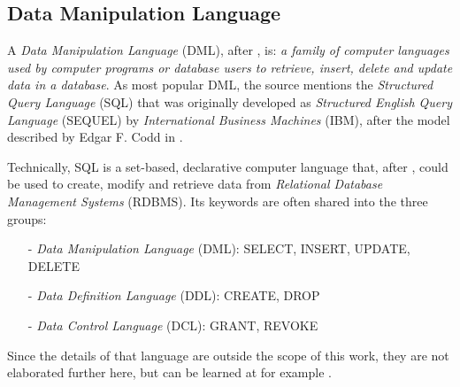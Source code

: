%
%
%
%
%
%
%

\subsection{Data Manipulation Language}
\label{data_manipulation_language_heading}

A \emph{Data Manipulation Language} (DML), after \cite{wikipedia}, is:
\textit{a family of computer languages used by computer programs or database
users to retrieve, insert, delete and update data in a database}. As most
popular DML, the source mentions the \emph{Structured Query Language} (SQL)
that was originally developed as \emph{Structured English Query Language}
(SEQUEL) by \emph{International Business Machines} (IBM), after the model
described by Edgar F. Codd in \cite{codd}.

Technically, SQL is a set-based, declarative computer language that, after
\cite{wikipedia}, could be used to create, modify and retrieve data from
\emph{Relational Database Management Systems} (RDBMS). Its keywords are often
shared into the three groups:

\begin{itemize}
    \item[-] \emph{Data Manipulation Language} (DML): SELECT, INSERT, UPDATE, DELETE
    \item[-] \emph{Data Definition Language} (DDL): CREATE, DROP
    \item[-] \emph{Data Control Language} (DCL): GRANT, REVOKE
\end{itemize}

Since the details of that language are outside the scope of this work, they are
not elaborated further here, but can be learned at for example \cite{sqltutorial}.
